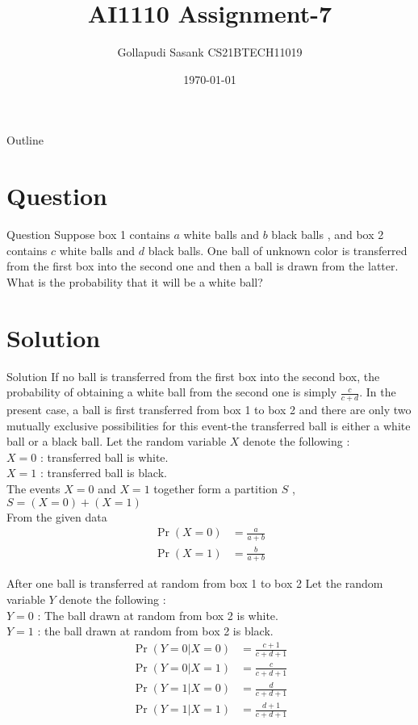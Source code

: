 \documentclass{beamer}
\title{AI1110 Assignment-7}
\author{Gollapudi Sasank CS21BTECH11019}
\date{\today}
\providecommand{\pr}[1]{\ensuremath{\Pr\left(#1\right)}}
\begin{document}
\begin{frame}
    \titlepage 
\end{frame}

\logo{}


\begin{frame}{Outline}
    \tableofcontents
\end{frame}


\section{Question}
\begin{frame}{Question}
Suppose box 1 contains $a$ white balls and $b$ black balls , and box 2 contains $c$ white balls and $d$ black balls.  One ball of unknown color is transferred from the first box into the second one and then a ball is drawn from the latter. What is the probability that it will be a white ball? 
\end{frame}


\section{Solution}
\begin{frame}{Solution}
If no ball is transferred from the first box into the second box, the probability of obtaining a white ball from the second one is simply $\frac{c}{c + d}$. In the present case, a ball is first transferred from box 1 to box 2 and there are only two mutually exclusive possibilities  for this event-the transferred ball is either a white ball or a black ball. Let the random variable $X$ denote the following : \\
$X = 0$ : transferred ball is white. \\
$X = 1$ : transferred ball is black. \\
The events $X=0$ and $X=1$ together form a partition $S$ , $S = (X=0) + (X=1)$ \\
From the given data 
\begin{align}
    \pr{X=0} &= \frac{a}{a+b} \\
    \pr{X=1} &= \frac{b}{a+b} 
\end{align}
\end{frame} 

\begin{frame}
After one ball is transferred at random from box 1 to box 2 Let the random variable $Y$ denote the following : \\
$Y = 0$ : The ball drawn at random from box 2 is white. \\
$Y = 1$ : the ball drawn at random from box 2 is black. \\
\begin{align}
    \pr{Y=0|X=0} &= \frac{c+1}{c+d+1} \\
    \pr{Y=0|X=1} &= \frac{c}{c+d+1} \\
    \pr{Y=1|X=0} &= \frac{d}{c+d+1} \\
    \pr{Y=1|X=1} &= \frac{d+1}{c+d+1} 
\end{align}

\end{frame}
\end{document}
